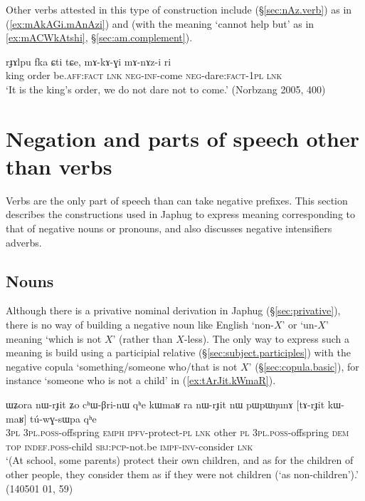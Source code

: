 Other verbs attested in this type of construction include  (§\ref{sec:nAz.verb}) as in (\ref{ex:mAkAGi.mAnAzi}) and  (with the meaning `cannot help but' as in \ref{ex:mACWkAtshi}, §\ref{sec:am.complement}).

\begin{exe}
	\ex \label{ex:mAkAGi.mAnAzi}
	\gll rɟɤlpu fka ɕti tɕe, mɤ-kɤ-ɣi mɤ-nɤz-i ri \\
	king order be.\textsc{aff}:\textsc{fact} \textsc{lnk} \textsc{neg}-\textsc{inf}-come \textsc{neg}-dare:\textsc{fact}-\textsc{1pl} \textsc{lnk} \\
	\glt `It is the king's order, we do not dare not to come.' (Norbzang 2005, 400)
\end{exe}


\section{Negation and parts of speech other than verbs} 
Verbs are the only part of speech than can take negative prefixes. This section describes the constructions used in Japhug to express meaning corresponding to that of negative nouns or pronouns, and also discusses negative intensifiers adverbs.

\subsection{Nouns} \label{sec:negation.noun}
Although there is a privative nominal derivation in Japhug (§\ref{sec:privative}), there is no way of building a negative noun like English `non-$X$' or  `un-$X$' meaning `which is not $X$' (rather than $X$-less). The only way to express such a meaning is build using a participial relative (§\ref{sec:subject.participles}) with the negative copula  `something/someone who/that is not $X$' (§\ref{sec:copula.basic}), for instance  `someone who is not a child' in (\ref{ex:tArJit.kWmaR}).

\begin{exe}
	\ex \label{ex:tArJit.kWmaR}
	\gll ɯʑora nɯ-rɟit ʑo cʰɯ-βri-nɯ qʰe kɯmaʁ ra nɯ-rɟit nɯ pɯpɯŋunɤ [tɤ-rɟit kɯ-maʁ] tú-wɣ-sɯpa qʰe \\
	\textsc{3pl} \textsc{3pl}.\textsc{poss}-offspring \textsc{emph} \textsc{ipfv}-protect-\textsc{pl} \textsc{lnk} other \textsc{pl} \textsc{3pl}.\textsc{poss}-offspring \textsc{dem} \textsc{top} \textsc{indef}.\textsc{poss}-child \textsc{sbj}:\textsc{pcp}-not.be \textsc{impf}-\textsc{inv}-consider \textsc{lnk} \\
	\glt `(At school, some parents) protect their own children, and as for the children of other people, they consider them as if they were not children (`as non-children').' (140501 01, 59)
\end{exe}

